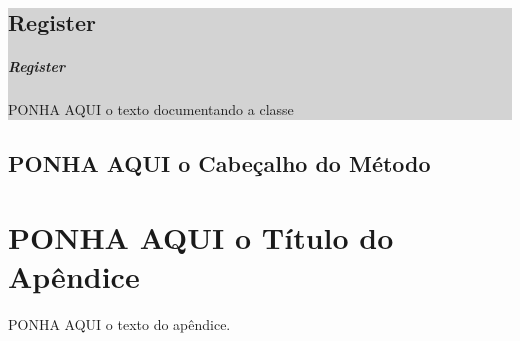 \documentclass[a4paper,12pt,openany]{book}
\begin{document}
\colorbox{lightgrey}{
	
\begin{minipage}{18cm}
	
\chapter*{Register}

\paragraph{Register}

PONHA AQUI o texto documentando a classe

\end{minipage}

}%

\newpage


\section*{PONHA AQUI o Cabeçalho do Método}

\newpage

\appendix


\chapter{PONHA AQUI o Título do Apêndice}

PONHA AQUI o texto do apêndice.

\newpage
\end{document}
